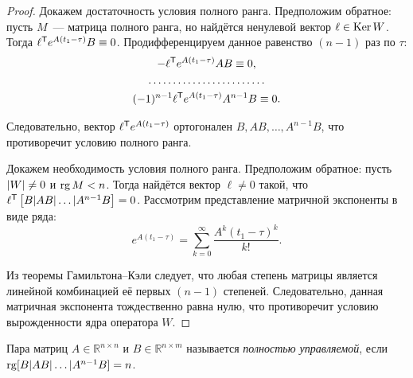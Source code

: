 \begin{proof}
  Докажем достаточность условия полного ранга. Предположим обратное:
  пусть $M$~--- матрица полного ранга, но найдётся ненулевой вектор $\ell \in \operatorname{Ker} W$.
  Тогда $\ell^{\mathsf{T}} e^{A(t_1 - \tau)} B \equiv 0$.
  Продифференцируем данное равенство $(n - 1)$ раз по $\tau$: 
  \begin{gather*}
    -\ell^{\mathsf{T}} e^{A(t_1 - \tau)} A B \equiv 0,\\
    \ldots\ldots\ldots\ldots\ldots\ldots\ldots\ldots\\
    (-1)^{n - 1} \ell^{\mathsf{T}} e^{A(t_1 - \tau)} A^{n - 1} B \equiv 0.
  \end{gather*}

  Следовательно, вектор $\ell^{\mathsf{T}} e^{A(t_1 - \tau)}$ ортогонален
  $B, AB, \ldots, A^{n - 1}B$, что противоречит условию полного ранга.
  
  Докажем необходимость условия полного ранга.
  Предположим обратное: пусть $\left| W \right| \neq 0$ и $\operatorname{rg} M < n$.
  Тогда найдётся вектор $\ell \neq 0$ такой,
  что $\ell^{\mathsf{T}} \left[ B | A B | \ldots | A^{n - 1} B \right] = 0$.
  Рассмотрим представление матричной экспоненты в виде ряда:
  \begin{equation*}
    e^{A(t_1 - \tau)} = \sum\limits_{k = 0}^{\infty} \frac{A^k (t_1 - \tau)^k}{k!}.
  \end{equation*}
  
  Из теоремы Гамильтона--Кэли следует, что любая степень матрицы является
  линейной комбинацией её первых $(n - 1)$ степеней. Следовательно, данная матричная экспонента
  тождественно равна нулю, что противоречит условию вырожденности ядра оператора $W$.
\end{proof}

\begin{df}
  Пара матриц $A \in \mathbb{R}^{n \times n}$ и $B \in \mathbb{R}^{n \times m}$
  называется \emph{полностью управляемой},
  если $\operatorname{rg} [B | A B | \ldots | A^{n - 1} B ] = n$.
\end{df}

